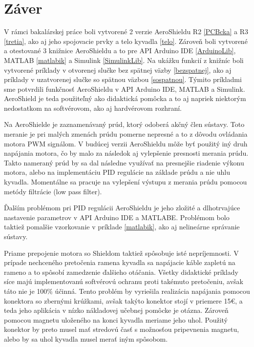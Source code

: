 \chapter{Záver}

 V rámci bakalárskej práce boli vytvorené 2 verzie AeroShieldu R2 \ref{PCBcka} a R3 \ref{tretia}, ako aj jeho spojovacie prvky a telo kyvadla \ref{telo}. Zároveň boli vytvorené a otestované 3 knižnice AeroShieldu a to pre API Arduino IDE \ref{ArduinoLib}, MATLAB \ref{matlabik} a Simulink \ref{SimulinkLib}. Na ukážku funkcií z knižníc boli vytvorené príklady v otvorenej slučke bez spätnej väzby \ref{bezspatnej}, ako aj príklady v uzatvorenej slučke so spätnou väzbou \ref{sospatnou}. Týmito príkladmi sme potvrdili funkčnosť AeroShieldu v API Arduino IDE, MATLAB a Simulink. AeroShield je teda použiteľný ako didaktická pomôcka a to aj napriek niektorým nedostatkom na softvérovom, ako aj hardvérovom rozhraní. 

Na AeroShielde je zaznamenávaný prúd, ktorý odoberá akčný člen sústavy. Toto meranie je pri malých zmenách prúdu pomerne nepresné a to z dôvodu ovládania motora PWM signálom. V budúcej verzii AeroShieldu môže byť použitý iný druh napájania motora, čo by malo za následok aj vylepšenie presnosti merania prúdu. Takto nameraný prúd by sa dal následne využívať na presnejšie riadenie výkonu motora, alebo na implementáciu PID regulácie na základe prúdu a nie uhlu kyvadla. Momentálne sa pracuje na vylepšení výstupu z merania prúdu pomocou metódy filtrácie (low pass filter).

Ďalším problémom pri PID regulácii AeroShieldu je jeho zložité a dlhotrvajúce nastavenie parametrov v API Arduino IDE a MATLABE. Problémom bolo taktiež pomalšie vzorkovanie v príklade \ref{matlabik}, ako aj nelineárne správanie sústavy.

Priame prepojenie motora so Shieldom taktiež spôsobuje isté nepríjemnosti. V prípade nechceného pretočenia ramena kyvadla sa napájacie káble zapletú na rameno a to spôsobí zamedzenie ďalšieho otáčania. Všetky didaktické príklady síce majú implementovanú softvérovú ochranu proti takémuto pretočeniu, avšak táto nie je 100\% účinná. 
Tento problém by vyriešila realizácia napájania pomocou konektora so zbernými krúžkami, avšak takýto konektor stojí v priemere 15\euro, a teda jeho aplikácia v nízko nákladovej učebnej pomôcke je otázna. Zároveň pomocou magnetu uloženého na konci kyvadla meriame jeho uhol. Použitý konektor by preto musel mať stredovú časť s možnosťou pripevnenia magnetu, alebo by sa uhol kyvadla musel merať iným spôsobom. 

